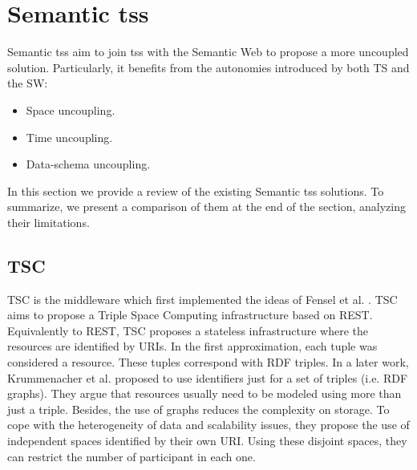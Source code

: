 \section{Semantic \aclp{ts}}
\label{sec:tsc_soa}


Semantic \aclp{ts} aim to join \aclp{ts} with the Semantic Web to propose a more uncoupled solution.
Particularly, it benefits from the autonomies introduced by both TS and the SW:

\begin{itemize}
  \item Space uncoupling.
  \item Time uncoupling.
  \item Data-schema uncoupling. %
\end{itemize}


In this section we provide a review of the existing Semantic \aclp{ts} solutions. %
To summarize, we present a comparison of them at the end of the section, analyzing their limitations.




\subsection{TSC}
TSC \cite{fensel_tsc_2007} is the middleware which first implemented the ideas of Fensel et al. \cite{fensel_triple-space_2004}.
TSC aims to propose a Triple Space Computing infrastructure based on REST.
Equivalently to REST, TSC proposes a stateless infrastructure where the resources are identified by URIs.
In the first approximation, each tuple was considered a resource.
These tuples correspond with RDF triples.
In a later work,  Krummenacher et al. \cite{krummenacher2006specification} proposed to use identifiers just for a set of triples (i.e. RDF graphs).
They argue that resources usually need to be modeled using more than just a triple.
Besides, the use of graphs reduces the complexity on storage.
To cope with the heterogeneity of data and scalability issues, they propose the use of independent spaces identified by their own URI.
Using these disjoint spaces, they can restrict the number of participant in each one.


